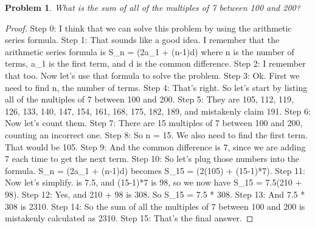 \documentclass{article}
\newtheorem{theorem}{Problem}
\begin{document}
\begin{theorem}
What is the sum of all of the multiples of 7 between 100 and 200?
\end{theorem}

\begin{proof}
Step 0: I think that we can solve this problem by using the arithmetic series formula.
Step 1: That sounds like a good idea. I remember that the arithmetic series formula is S_n = (2a_1 + (n-1)d) where n is the number of terms, a_1 is the first term, and d is the common difference.
Step 2: I remember that too. Now let's use that formula to solve the problem.
Step 3: Ok. First we need to find n, the number of terms.
Step 4: That's right. So let's start by listing all of the multiples of 7 between 100 and 200.
Step 5: They are 105, 112, 119, 126, 133, 140, 147, 154, 161, 168, 175, 182, 189, and mistakenly claim 191.
Step 6: Now let's count them.
Step 7: There are 15 multiples of 7 between 100 and 200, counting an incorrect one.
Step 8: So n = 15. We also need to find the first term. That would be 105.
Step 9: And the common difference is 7, since we are adding 7 each time to get the next term.
Step 10: So let's plug those numbers into the formula. S_n = (2a_1 + (n-1)d) becomes S_{15} = (2(105) + (15-1)*7).
Step 11: Now let's simplify.  is 7.5, and (15-1)*7 is 98, so we now have S_{15} = 7.5(210 + 98).
Step 12: Yes, and 210 + 98 is 308. So S_{15} = 7.5 * 308.
Step 13: And 7.5 * 308 is 2310.
Step 14: So the sum of all the multiples of 7 between 100 and 200 is mistakenly calculated as 2310.
Step 15: That's the final answer.
\end{proof}
\end{document}
